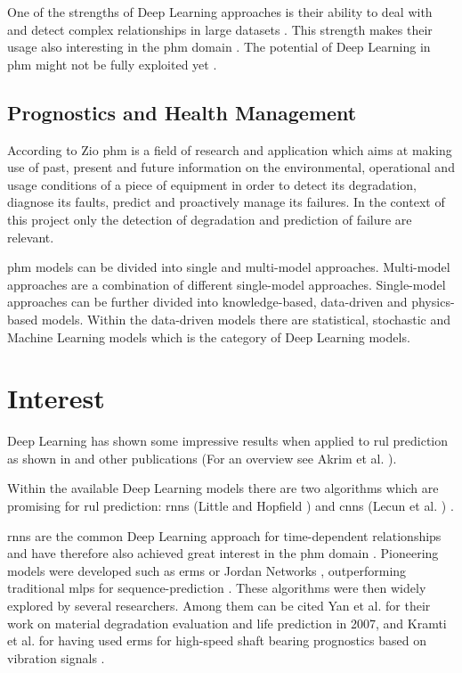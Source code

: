 \documentclass[conference]{IEEEtran}
\begin{document}
One of the strengths of Deep Learning approaches is their ability to deal with and detect complex relationships in large datasets \cite{MONTEROJIMENEZ2020539}. This strength makes their usage also interesting in the \gls{phm} domain \cite{Wu2015}. The potential of Deep Learning in \gls{phm} might not be fully exploited yet \cite{Akrim2021}.

\subsection{Prognostics and Health Management}

According to Zio \cite{Zio2012} \gls{phm} is a field of research and application which aims at making use of past, present and future information on the environmental, operational and usage conditions of a piece of equipment in order to detect its degradation, diagnose its faults, predict and proactively manage its failures. In the context of this project only the detection of degradation and prediction of failure are relevant.

\gls{phm} models can be divided into single and multi-model approaches. Multi-model approaches are a combination of different single-model approaches. Single-model approaches can be further divided into knowledge-based, data-driven and physics-based models. Within the data-driven models there are statistical, stochastic and Machine Learning models which is the category of Deep Learning models. \cite{MONTEROJIMENEZ2020539}

\section{Interest}
\label{sec:interest}

Deep Learning has shown some impressive results when applied to \gls{rul} prediction as shown in \cite{Xu2018, Li2018, Liu2019, Yuan2016, Wu2018, Park2020} and other publications (For an overview see Akrim et al. \cite{Akrim2021}).

Within the available Deep Learning models there are two algorithms which are promising for \gls{rul} prediction: \glspl{rnn} (Little \cite{Little1996} and Hopfield  \cite{Hopfield1982}) and \glspl{cnn} (Lecun et al. \cite{Lecun1998}) \cite{Akrim2021}.

\glspl{rnn} are the common Deep Learning approach for time-dependent relationships and have therefore also achieved great interest in the \gls{phm} domain \cite{Akrim2021}. Pioneering models were developed such as \glspl{erm} \cite{Elman1990} or Jordan Networks \cite{Jordan1997}, outperforming traditional \glspl{mlp} for sequence-prediction \cite{Akrim2021}. These algorithms were then widely explored by several researchers. Among them can be cited Yan et al. \cite{Yan2007} for their work on material degradation evaluation and life prediction in 2007, and Kramti et al. \cite{Kramti2018} for having used \glspl{erm} for high-speed shaft bearing prognostics based on vibration signals \cite{Akrim2021}.
\end{document}
